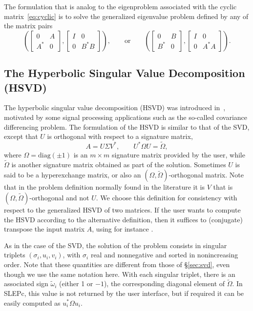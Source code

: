 The formulation that is analog to the eigenproblem associated with the cyclic matrix~\eqref{eq:cyclic} is to solve the generalized eigenvalue problem defined by any of the matrix pairs
\begin{equation}
\label{eq:gsvdeigcyclic}
\left(
\begin{bmatrix}0&A\\A^*&0\end{bmatrix},
\begin{bmatrix}I&0\\0&B^*B\end{bmatrix}
\right),
\qquad\text{or}\qquad
\left(
\begin{bmatrix}0&B\\B^*&0\end{bmatrix},
\begin{bmatrix}I&0\\0&A^*A\end{bmatrix}
\right).
\end{equation}

\subsection{\label{sec:hsvd}The Hyperbolic Singular Value Decomposition (HSVD)}

The hyperbolic singular value decomposition (HSVD) was introduced in~\citep{Onn:1991:EMP}, motivated by some signal processing applications such as the so-called covariance differencing problem. The formulation of the HSVD is similar to that of the SVD, except that $U$ is orthogonal with respect to a signature matrix,
\begin{equation}
\label{eq:hsvd}
A=U\Sigma V^*,\qquad U^*\Omega U=\tilde\Omega,
\end{equation}
where $\Omega=\mathrm{diag}(\pm 1)$ is an $m\times m$ signature matrix provided by the user, while $\tilde\Omega$ is another signature matrix obtained as part of the solution. Sometimes $U$ is said to be a hyperexchange matrix, or also an $(\Omega,\tilde\Omega)$-orthogonal matrix. Note that in the problem definition normally found in the literature it is $V$ that is $(\Omega,\tilde\Omega)$-orthogonal and not $U$. We choose this definition for consistency with respect to the generalized HSVD of two matrices. If the user wants to compute the HSVD according to the alternative definition, then it suffices to (conjugate) transpose the input matrix $A$, using for instance .

As in the case of the SVD, the solution of the problem consists in singular triplets $(\sigma_i,u_i,v_i)$, with $\sigma_i$ real and nonnegative and sorted in nonincreasing order. Note that these quantities are different from those of \S\ref{sec:svd}, even though we use the same notation here. With each singular triplet, there is an associated sign $\tilde\omega_i$ (either 1 or $-1$), the corresponding diagonal element of $\tilde\Omega$. In SLEPc, this value is not returned by the user interface, but if required it can be easily computed as $u_i^*\Omega u_i$.

